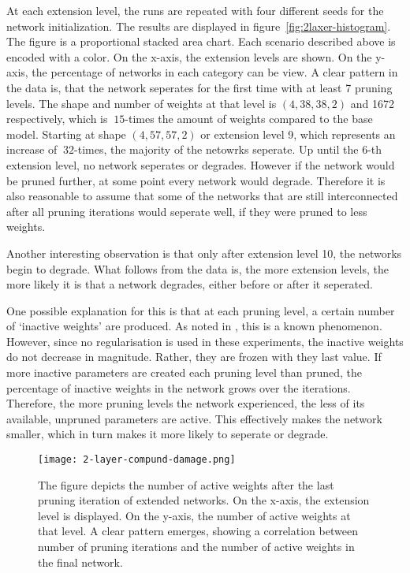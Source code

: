 At each extension level, the runs are repeated with four different seeds for the network initialization.
The results are displayed in figure~\ref{fig:2laxer-histogram}.
The figure is a proportional stacked area chart.
Each scenario described above is encoded with a color.
On the x-axis, the extension levels are shown.
On the y-axis, the percentage of networks in each category can be view.
A clear pattern in the data is, that the network seperates for the first time with at least 7 pruning levels.
The shape and number of weights at that level is $(4,38,38,2)$ and 1672 respectively, which is $~15$-times the amount of weights compared to the base model. 
Starting at shape $(4,57,57,2)$ or extension level 9, which represents an increase of $~32$-times, the majority of the netowrks seperate.
Up until the 6-th extension level, no network seperates or degrades. 
However if the network would be pruned further, at some point every network would degrade.
Therefore it is also reasonable to assume that some of the networks that are still interconnected after all pruning iterations would seperate well, if they were pruned to less weights.

Another interesting observation is that only after extension level 10, the networks begin to degrade.
What follows from the data is, the more extension levels, the more likely it is that a network degrades, either before or after it seperated.

One possible explanation for this is that at each pruning level, a certain number of `inactive weights' are produced.
As noted in \autocite{HanEtAl15, AllAlivePruning}, this is a known phenomenon.
However, since no regularisation is used in these experiments, the inactive weights do not decrease in magnitude.
Rather, they are frozen with they last value.
If more inactive parameters are created each pruning level than pruned, the percentage of inactive weights in the network grows over the iterations.
Therefore, the more pruning levels the network experienced, the less of its available, unpruned parameters are active.
This effectively makes the network smaller, which in turn makes it more likely to seperate or degrade.

\begin{figure}[ht]
    \centering
    \texttt{[image: 2-layer-compund-damage.png]}
    \caption{
        The figure depicts the number of active weights after the last pruning iteration of extended networks.
        On the x-axis, the extension level is displayed.
        On the y-axis, the number of active weights at that level.
        A clear pattern emerges, showing a correlation between number of pruning iterations and the number of active weights in the final network.
    }\label{fig:collateral_damage}
\end{figure}

